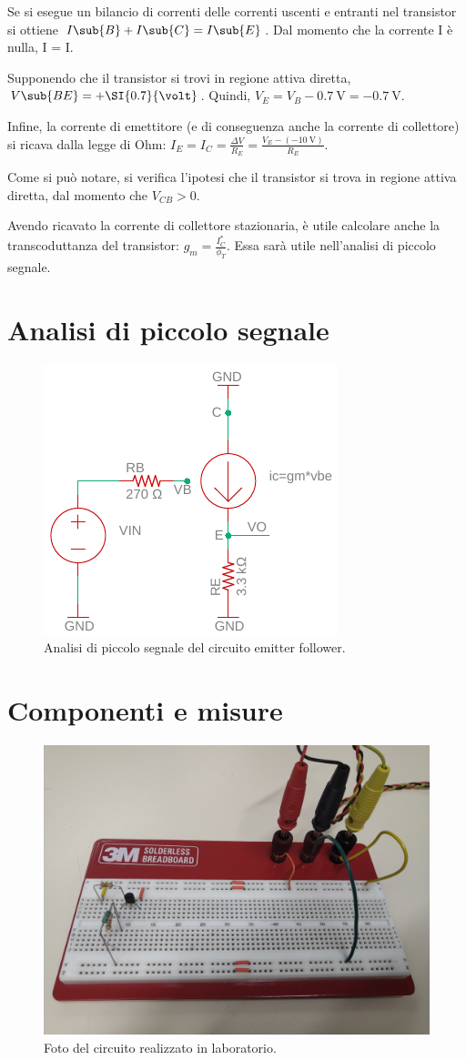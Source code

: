 Se si esegue un bilancio di correnti delle correnti uscenti e entranti nel transistor si ottiene $I\sub{B}+I\sub{C}=I\sub{E}$. Dal momento che la corrente I è nulla, I = I.

Supponendo che il transistor si trovi in regione attiva diretta, $V\sub{BE}=+\SI{0.7}{\volt}$. Quindi, $V_E=V_B-\SI{0.7}{\volt}= -\SI{0.7}{\volt}$.

Infine, la corrente di emettitore (e di conseguenza anche la corrente di collettore) si ricava dalla legge di Ohm: $I_E=I_C=\frac{\Delta V}{R_E}=\frac{V_E-(-\SI{10}{\volt})}{R_E}$. 

Come si può notare, si verifica l'ipotesi che il transistor si trova in regione attiva diretta, dal momento che $V_{CB}>0$.

Avendo ricavato la corrente di collettore stazionaria, è utile calcolare anche la transcoduttanza del transistor: $g_m=\frac{I_C^*}{\phi_T}$. Essa sarà utile nell'analisi di piccolo segnale.
\section{Analisi di piccolo segnale}
\begin{figure}[h!]
	\centering
	\includegraphics[width=0.4\linewidth]{./OtherFiles/Laboratorio 1/emitter follower_piccolo segnale}
	\caption{Analisi di piccolo segnale del circuito emitter follower.}
	\label{fig:emitterfollwer_piccolo segnale}
\end{figure}
\section{Componenti e misure}
\begin{figure}[h!]
	\centering
	\includegraphics[width=0.4\linewidth]{./ImageFiles/Laboratorio 1/IMG_20220510_103526}
	\caption{Foto del circuito realizzato in laboratorio.}
	\label{fig:emitterfollwer_circuito}
\end{figure}
